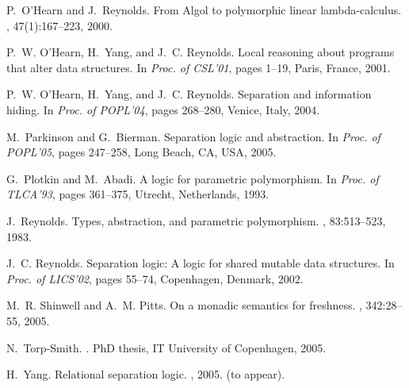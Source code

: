 \documentclass{LMCS}
\begin{document}
\begin{thebibliography}{10}
P.~O'Hearn and J.~Reynolds.
\newblock From {A}lgol to polymorphic linear lambda-calculus.
, 47(1):167--223, 2000.

P.~W. O'Hearn, H.~Yang, and J.~C. Reynolds.
\newblock Local reasoning about programs that alter data structures.
\newblock In {\em Proc. of CSL'01}, pages 1--19, Paris, France, 2001.

P.~W. O'Hearn, H.~Yang, and J.~C. Reynolds.
\newblock Separation and information hiding.
\newblock In {\em Proc. of POPL'04}, pages 268--280, Venice, Italy, 2004.

M.~Parkinson and G.~Bierman.
\newblock Separation logic and abstraction.
\newblock In {\em Proc. of POPL'05}, pages 247--258, Long Beach, CA, USA, 2005.

G.~Plotkin and M.~Abadi.
\newblock A logic for parametric polymorphism.
\newblock In {\em Proc. of TLCA'93}, pages 361--375, Utrecht, Netherlands,
  1993.

J.~Reynolds.
\newblock Types, abstraction, and parametric polymorphism.
, 83:513--523, 1983.

J.~C. Reynolds.
\newblock Separation logic: A logic for shared mutable data structures.
\newblock In {\em Proc. of LICS'02}, pages 55--74, Copenhagen, Denmark, 2002.

M.~R. Shinwell and A.~M. Pitts.
\newblock On a monadic semantics for freshness.
, 342:28--55, 2005.

N.~Torp-Smith.
.
\newblock PhD thesis, IT University of Copenhagen, 2005.

H.~Yang.
\newblock Relational separation logic.
, 2005.
\newblock (to appear).

\end{thebibliography}
\end{document}
